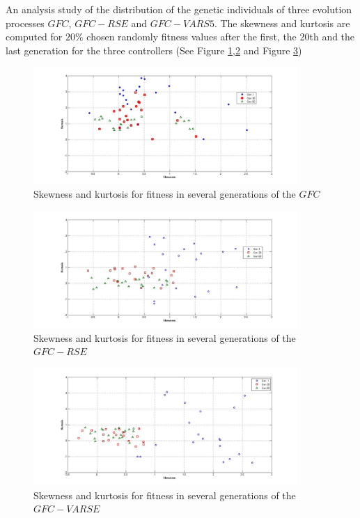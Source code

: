 \documentclass[10pt,journal,compsoc]{IEEEtran}
\begin{document}

An analysis study of the distribution  of the genetic individuals of three evolution processes $GFC$, $GFC-RSE$ and $GFC-VARS5$.
The skewness and kurtosis are computed for $20\%$ chosen randomly fitness values after the first, the 20th and the last generation for the three controllers (See Figure \ref{fig:gfcsk},\ref{fig:gfcrsesk} and Figure \ref{fig:gfcvarsesk})


\begin{figure}[!ht]	
	\begin{center}
		\includegraphics[width=10cm]{fig/gfc.jpg}
		\caption{Skewness and kurtosis for fitness in several generations
			of the  $GFC$}
		\label{fig:gfcsk}	
	\end{center}	
\end{figure}
\begin{figure}[!ht]	
	\begin{center}
		\includegraphics[width=10cm]{fig/gfcrse.jpg}
		\caption{Skewness and kurtosis for fitness in several generations
			of the  $GFC-RSE$}
		\label{fig:gfcrsesk}	
	\end{center}	
\end{figure}
\begin{figure}[!ht]	
	\begin{center}
		\includegraphics[width=10cm]{fig/gfcvarse.jpg}
		\caption{Skewness and kurtosis for fitness in several generations
			of the  $GFC-VARSE$}
		\label{fig:gfcvarsesk}	
	\end{center}	
\end{figure}
\end{document}
